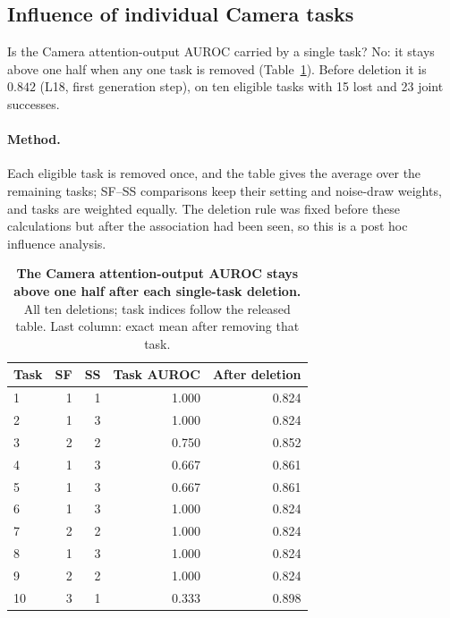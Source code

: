 \subsection{Influence of individual Camera tasks}
\label{sec:auc-influence}
Is the Camera attention-output AUROC carried by a single task? No: it stays above one half when any one task is removed (Table~\ref{tab:auc-influence}). Before deletion it is $0.842$ (L18, first generation step), on ten eligible tasks with 15 lost and 23 joint successes.

\paragraph{Method.}
Each eligible task is removed once, and the table gives the average over the remaining tasks; SF--SS comparisons keep their setting and noise-draw weights, and tasks are weighted equally. The deletion rule was fixed before these calculations but after the association had been seen, so this is a post hoc influence analysis.

\begin{table}[h]
\caption{\textbf{The Camera attention-output AUROC stays above one half after each single-task deletion.} All ten deletions; task indices follow the released table. Last column: exact mean after removing that task.}
\centering\small
\begin{tabular}{lrrrr}\toprule
Task & SF & SS & Task AUROC & After deletion\\\midrule
1 & 1 & 1 & 1.000 & 0.824\\
2 & 1 & 3 & 1.000 & 0.824\\
3 & 2 & 2 & 0.750 & 0.852\\
4 & 1 & 3 & 0.667 & 0.861\\
5 & 1 & 3 & 0.667 & 0.861\\
6 & 1 & 3 & 1.000 & 0.824\\
7 & 2 & 2 & 1.000 & 0.824\\
8 & 1 & 3 & 1.000 & 0.824\\
9 & 2 & 2 & 1.000 & 0.824\\
10 & 3 & 1 & 0.333 & 0.898\\
\bottomrule\end{tabular}

\label{tab:auc-influence}
\end{table}
